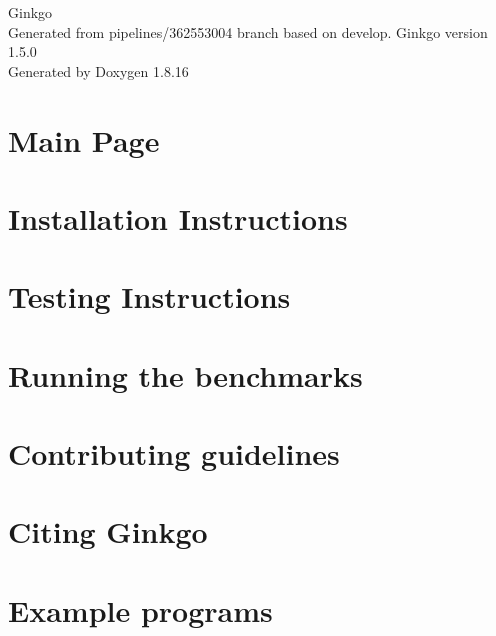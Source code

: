 \let\mypdfximage\pdfximage\def\pdfximage{\immediate\mypdfximage}\documentclass[twoside]{book}
\newcommand{\+}{\discretionary{\mbox{\scriptsize$\hookleftarrow$}}{}{}}
\newcommand{\clearemptydoublepage}{%
  \newpage{\pagestyle{empty}\cleardoublepage}%
}
\begin{document}
\hypersetup{pageanchor=false,
             bookmarksnumbered=true,
             pdfencoding=unicode
            }
\begin{titlepage}
\vspace*{7cm}
\begin{center}%
{\Large Ginkgo \\[1ex]\large Generated from pipelines/362553004 branch based on develop. Ginkgo version 1.\+5.\+0 }\\
\vspace*{1cm}
{\large Generated by Doxygen 1.8.16}\\
\end{center}
\end{titlepage}
\clearemptydoublepage
{}
\tableofcontents
\clearemptydoublepage
{}
\hypersetup{pageanchor=true}

\chapter{Main Page}
\label{index}\hypertarget{index}{}
\chapter{Installation Instructions}
\label{install_ginkgo}

\chapter{Testing Instructions}
\label{testing_ginkgo}

\chapter{Running the benchmarks}
\label{benchmarking_ginkgo}

\chapter{Contributing guidelines}
\label{contributing_guidelines}

\chapter{Citing Ginkgo}
\label{citing_ginkgo}

\chapter{Example programs}
\label{Examples}

\end{document}
